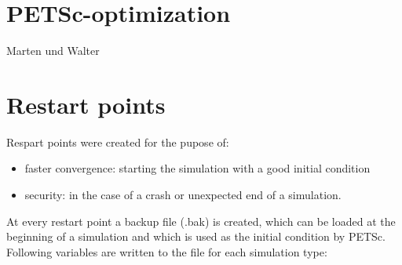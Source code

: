 
\newpage
\section{PETSc-optimization} %
\label{sec:petsc_optimization}

Marten und Walter


\newpage
\section{Restart points} %
\label{sec:restart_points}

Respart points were created for the pupose of:
\begin{itemize}
\item faster convergence: starting the simulation with a good initial condition
\item security: in the case of a crash or unexpected end of a simulation.
\end{itemize}

\noii At every restart point a backup file (.bak) is created, which can be loaded at the beginning of a simulation and which is used as the initial condition by PETSc. Following variables are written to the file for each simulation type:

\newcommand{\che}{$\checkmark$}

